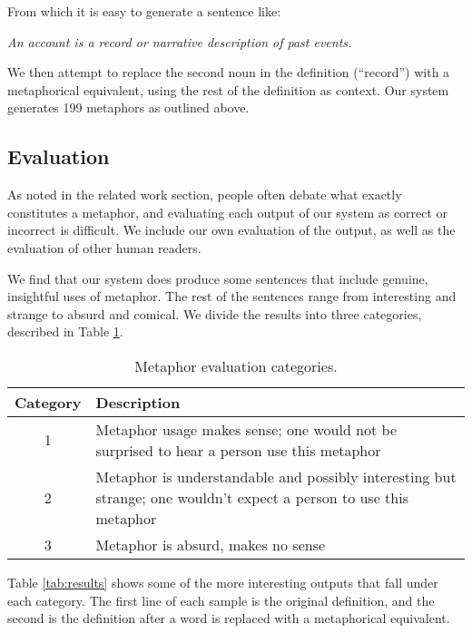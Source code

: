 \documentclass[12pt]{article}
\begin{document}
\noindent
From which it is easy to generate a sentence like:

\begin{center}
    \emph{An account is a record or narrative description of past events.}
\end{center}

\noindent
We then attempt to replace the second noun in the definition (``record'') with a metaphorical equivalent, using the rest of the definition as context. Our system generates 199 metaphors as outlined above.

\subsection{Evaluation}

As noted in the related work section, people often debate what exactly constitutes a metaphor, and evaluating each output of our system as correct or incorrect is difficult. We include our own evaluation of the output, as well as the evaluation of other human readers.

We find that our system does produce some sentences that include genuine, insightful uses of metaphor. The rest of the sentences range from interesting and strange to absurd and comical. We divide the results into three categories, described in Table \ref{tab:evalcats}.

\begin{table}[h]
	\centering
	\small
	\begin{tabular}{|c|p{12cm}|} \hline
		\textbf{Category} & \textbf{Description}\\ \hline
		1 & Metaphor usage makes sense; one would not be surprised to hear a person use this metaphor\\ \hline
        2 & Metaphor is understandable and possibly interesting but strange; one wouldn’t expect a person to use this metaphor\\ \hline
		3 & Metaphor is absurd, makes no sense\\ \hline
	\end{tabular}
	\caption{Metaphor evaluation categories.}
	\label{tab:evalcats}
\end{table}

Table \ref{tab:results} shows some of the more interesting outputs that fall under each category. The first line of each sample is the original definition, and the second is the definition after a word is replaced with a metaphorical equivalent.
\end{document}
